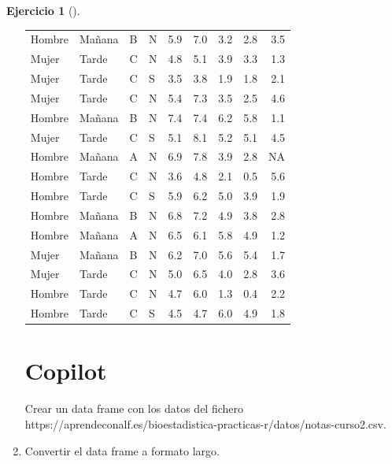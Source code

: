 \documentclass[
  a4paper,
]{scrreport}
\newenvironment{Shaded}{\begin{snugshade}}{\end{snugshade}}
\newcommand{\ExtensionTok}[1]{\textcolor[rgb]{0.00,0.23,0.31}{#1}}
\newcommand{\NormalTok}[1]{\textcolor[rgb]{0.00,0.23,0.31}{#1}}
\theoremstyle{definition}
\newtheorem{exercise}{Ejercicio}[chapter]
\theoremstyle{remark}
\begin{document}
\begin{exercise}[]
\begin{enumerate}
\begin{tcolorbox}
\begin{longtable}[]{@{}llllrrrrr@{}}
  Hombre & Mañana & B & N & 5.9 & 7.0 & 3.2 & 2.8 & 3.5 \\
  Mujer & Tarde & C & N & 4.8 & 5.1 & 3.9 & 3.3 & 1.3 \\
  Mujer & Tarde & C & S & 3.5 & 3.8 & 1.9 & 1.8 & 2.1 \\
  Mujer & Tarde & C & N & 5.4 & 7.3 & 3.5 & 2.5 & 4.6 \\
  Hombre & Mañana & B & N & 7.4 & 7.4 & 6.2 & 5.8 & 1.1 \\
  Mujer & Tarde & C & S & 5.1 & 8.1 & 5.2 & 5.1 & 4.5 \\
  Hombre & Mañana & A & N & 6.9 & 7.8 & 3.9 & 2.8 & NA \\
  Hombre & Tarde & C & N & 3.6 & 4.8 & 2.1 & 0.5 & 5.6 \\
  Hombre & Tarde & C & S & 5.9 & 6.2 & 5.0 & 3.9 & 1.9 \\
  Hombre & Mañana & B & N & 6.8 & 7.2 & 4.9 & 3.8 & 2.8 \\
  Hombre & Mañana & A & N & 6.5 & 6.1 & 5.8 & 4.9 & 1.2 \\
  Mujer & Mañana & B & N & 6.2 & 7.0 & 5.6 & 5.4 & 1.7 \\
  Mujer & Tarde & C & N & 5.0 & 6.5 & 4.0 & 2.8 & 3.6 \\
  Hombre & Tarde & C & N & 4.7 & 6.0 & 1.3 & 0.4 & 2.2 \\
  Hombre & Tarde & C & S & 4.5 & 4.7 & 6.0 & 4.9 & 1.8 \\
  \end{longtable}

  \section{Copilot}

\begin{Shaded}
\begin{Highlighting}[]
\ExtensionTok{Crear}\NormalTok{ un data frame con los datos del fichero https://aprendeconalf.es/bioestadistica{-}practicas{-}r/datos/notas{-}curso2.csv.}
\end{Highlighting}
\end{Shaded}

  \end{tcolorbox}
\item
  Convertir el data frame a formato largo.

  \begin{tcolorbox}[enhanced jigsaw, colframe=quarto-callout-tip-color-frame, toprule=.15mm, bottomtitle=1mm, breakable, opacitybacktitle=0.6, toptitle=1mm, colback=white, bottomrule=.15mm, title=\textcolor{quarto-callout-tip-color}{\faLightbulb}\hspace{0.5em}{Solución}, arc=.35mm, left=2mm, titlerule=0mm, rightrule=.15mm, coltitle=black, leftrule=.75mm, opacityback=0, colbacktitle=quarto-callout-tip-color!10!white]


\end{tcolorbox}
\end{enumerate}
\end{exercise}
\end{document}
